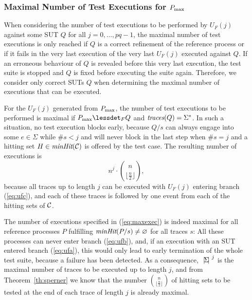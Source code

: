 \subsubsection*{Maximal Number of Test Executions for $P_\text{max}$}

When considering the number of test executions to be performed by 
$U_F(j)$ against some SUT $Q$ for all $j=0,\dots,pq-1$, the maximal number of 
test executions is only reached if $Q$ is a correct refinement of the reference
process or if it fails in the very last execution of the very last $U_F(j)$ 
executed against $Q$. If an erroneous behaviour of $Q$ is revealed before this
very last execution, the test suite is stopped and $Q$ is fixed before
executing the suite again.
Therefore, we consider only correct SUTs $Q$ when determining the
maximal number of executions that can be executed.

For the  $U_F(j)$ generated from $P_\text{max}$, the number of test executions
 to be performed is maximal if $\pmax\lessdet_F Q$ and 
$\text{\it traces}(Q) = \Sigma^*$. In such a situation, no test execution blocks early, because
$Q/s$ can always engage into some $e\in\Sigma$   while $\#s<j$ and will never block
in the last step when $\#s = j$ and a hitting set $H\in\text{\it minHit}({\cal C})$ is 
offered by the test case. The resulting number of executions is
%
\begin{equation}
\label{eq:maxexec}
n^{j}\cdot \binom{n}{\lfloor\frac{n}{2}\rfloor},
\end{equation}
%
because all traces up to length $j$ can be executed with $U_F(j)$ entering branch
(\ref{eq:ufc}), and each of these traces is followed by one event
from each of the hitting sets of ${\cal C}$.

The number of executions specified in (\ref{eq:maxexec}) is indeed maximal for
all reference processes $P$ fulfilling $\text{\it minHit}(P/s)\neq\varnothing$ for all
traces $s$: All these processes can never enter branch (\ref{eq:ufb}), and,
if an execution with an SUT entered branch (\ref{eq:ufa}), this would only lead to early termination of the whole test suite, because a failure has been detected.
As a consequence, ${~|\! \Sigma\!|~}^{j}$ is the maximal number of traces to be executed 
up to length $j$, and from Theorem~\ref{th:sperner} we know that the number
$\binom{n}{\lfloor\frac{n}{2}\rfloor}$ of hitting sets to be tested at the end of each trace of length $j$ is already maximal.

